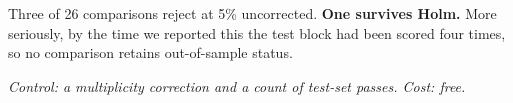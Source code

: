 Three of 26 comparisons reject at 5\% uncorrected. \textbf{One survives Holm.} More seriously, by the
time we reported this the test block had been scored four times, so no comparison retains
out-of-sample status.

\emph{Control: a multiplicity correction and a count of test-set passes. Cost: free.}
